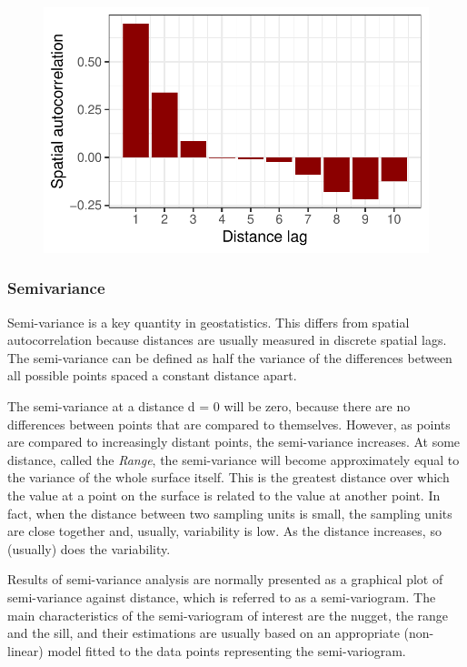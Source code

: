 \documentclass[
  letterpaper,
  DIV=11,
  numbers=noendperiod]{scrreprt}
\begin{document}
\begin{figure}[H]

{\centering \includegraphics{./spatial-tests_files/figure-pdf/unnamed-chunk-68-1.pdf}

}

\end{figure}

\hypertarget{semivariance}{%
\subsubsection{Semivariance}\label{semivariance}}

Semi-variance is a key quantity in geostatistics. This differs from
spatial autocorrelation because distances are usually measured in
discrete spatial lags. The semi-variance can be defined as half the
variance of the differences between all possible points spaced a
constant distance apart.

The semi-variance at a distance d = 0 will be zero, because there are no
differences between points that are compared to themselves. However, as
points are compared to increasingly distant points, the semi-variance
increases. At some distance, called the \emph{Range}, the semi-variance
will become approximately equal to the variance of the whole surface
itself. This is the greatest distance over which the value at a point on
the surface is related to the value at another point. In fact, when the
distance between two sampling units is small, the sampling units are
close together and, usually, variability is low. As the distance
increases, so (usually) does the variability.

Results of semi-variance analysis are normally presented as a graphical
plot of semi-variance against distance, which is referred to as a
semi-variogram. The main characteristics of the semi-variogram of
interest are the nugget, the range and the sill, and their estimations
are usually based on an appropriate (non-linear) model fitted to the
data points representing the semi-variogram.
\end{document}

